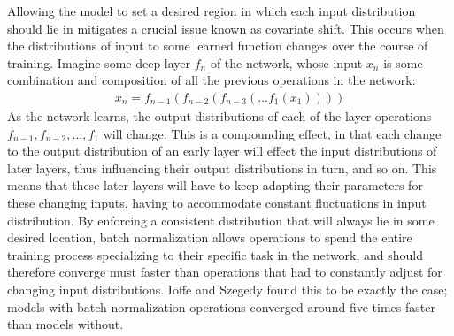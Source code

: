 Allowing the model to set a desired region in which each input distribution should lie in mitigates a crucial issue
known as covariate shift. This occurs when the distributions of input to some learned function changes over the
course of training. Imagine some deep layer $f_n$ of the network, whose input $x_n$ is some combination and
composition of all the previous operations in the network:
\begin{align}
	x_n = f_{n-1}\left( f_{n-2} \left( f_{n-3} \left( \dots f_{1} \left(x_1\right) \right) \right) \right)
\end{align}
\overfullrule=0pt
As the network learns, the output distributions of each of the layer operations $f_{n-1}, f_{n-2}, \dots , f_1$ will change. This is a compounding effect, in that each change to the output distribution of an early layer will effect the input distributions
of later layers, thus influencing their output distributions in turn, and so on. This means that these later layers will have to keep adapting their parameters for these changing inputs, having to accommodate constant fluctuations in input distribution.
By enforcing a consistent distribution that will always lie in some desired location, batch normalization allows operations
to spend the entire training process specializing to their specific task in the network, and should therefore converge must
faster than operations that had to constantly adjust for changing input distributions. Ioffe and Szegedy found this to be
exactly the case; models with batch-normalization operations converged around five times faster than models without.

